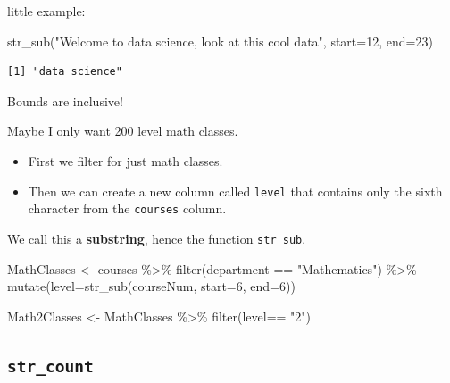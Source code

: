 \documentclass[
  letterpaper,
  DIV=11,
  numbers=noendperiod]{scrartcl}
\newenvironment{Shaded}{\begin{snugshade}}{\end{snugshade}}
\newcommand{\AttributeTok}[1]{\textcolor[rgb]{0.40,0.45,0.13}{#1}}
\newcommand{\DecValTok}[1]{\textcolor[rgb]{0.68,0.00,0.00}{#1}}
\newcommand{\FunctionTok}[1]{\textcolor[rgb]{0.28,0.35,0.67}{#1}}
\newcommand{\NormalTok}[1]{\textcolor[rgb]{0.00,0.23,0.31}{#1}}
\newcommand{\OtherTok}[1]{\textcolor[rgb]{0.00,0.23,0.31}{#1}}
\newcommand{\SpecialCharTok}[1]{\textcolor[rgb]{0.37,0.37,0.37}{#1}}
\newcommand{\StringTok}[1]{\textcolor[rgb]{0.13,0.47,0.30}{#1}}
\providecommand{\tightlist}{%
  \setlength{\itemsep}{0pt}\setlength{\parskip}{0pt}}\usepackage{longtable,booktabs,array}
\begin{document}
little example:

\begin{Shaded}
\begin{Highlighting}[]
\FunctionTok{str\_sub}\NormalTok{(}\StringTok{"Welcome to data science, look at this cool data"}\NormalTok{, }\AttributeTok{start=}\DecValTok{12}\NormalTok{, }\AttributeTok{end=}\DecValTok{23}\NormalTok{) }
\end{Highlighting}
\end{Shaded}

\begin{verbatim}
[1] "data science"
\end{verbatim}

Bounds are inclusive!

Maybe I only want 200 level math classes.

\begin{itemize}
\tightlist
\item
  First we filter for just math classes.
\item
  Then we can create a new column called \texttt{level} that contains
  only the sixth character from the \texttt{courses} column.
\end{itemize}

We call this a \textbf{substring}, hence the function \texttt{str\_sub}.

\begin{Shaded}
\begin{Highlighting}[]
\NormalTok{MathClasses }\OtherTok{\textless{}{-}}\NormalTok{ courses }\SpecialCharTok{\%\textgreater{}\%} 
  \FunctionTok{filter}\NormalTok{(department }\SpecialCharTok{==} \StringTok{"Mathematics"}\NormalTok{) }\SpecialCharTok{\%\textgreater{}\%} 
  \FunctionTok{mutate}\NormalTok{(}\AttributeTok{level=}\FunctionTok{str\_sub}\NormalTok{(courseNum, }\AttributeTok{start=}\DecValTok{6}\NormalTok{, }\AttributeTok{end=}\DecValTok{6}\NormalTok{)) }

\NormalTok{Math2Classes }\OtherTok{\textless{}{-}}\NormalTok{ MathClasses }\SpecialCharTok{\%\textgreater{}\%} 
  \FunctionTok{filter}\NormalTok{(level}\SpecialCharTok{==} \StringTok{"2"}\NormalTok{)}
\end{Highlighting}
\end{Shaded}

\hypertarget{str_count}{%
\subsection{\texorpdfstring{\texttt{str\_count}}{str\_count}}\label{str_count}}
\end{document}
